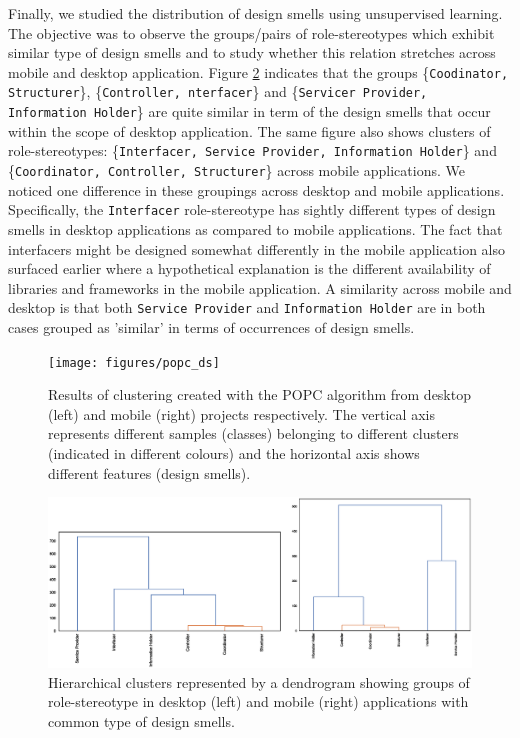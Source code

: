 \documentclass[AMA,Times1COL]{WileyNJDv5} %
\begin{document}
	Finally, we studied the distribution of design smells using unsupervised learning. The objective was to observe the groups/pairs of role-stereotypes which exhibit similar type of design smells and to study whether this relation stretches across mobile and desktop application. Figure \ref{fig:dendogram_rs} indicates that the groups \{{\tt Coodinator, Structurer}\}, 
	\{{\tt Controller, nterfacer}\} and 
	\{{\tt Servicer Provider, Information Holder}\} are quite similar in term of the design smells that occur within the scope of desktop application. The same figure also shows clusters of role-stereotypes:  \{{\tt Interfacer, Service Provider, Information Holder}\} and \{{\tt Coordinator, Controller, Structurer}\} across mobile applications. 
	We noticed one difference in these groupings across desktop and mobile applications. Specifically, the {\tt Interfacer} role-stereotype has sightly different types of design smells in desktop applications as compared to mobile applications. The fact that interfacers might be designed somewhat differently in the mobile application also surfaced earlier where a hypothetical explanation is the different availability of libraries and frameworks in the mobile application.
	A similarity across mobile and desktop is that both {\tt Service Provider} and {\tt Information Holder} are in both cases grouped as 'similar' in terms of occurrences of design smells.
	
	\begin{figure}[h]
		\centering
		\texttt{[image: figures/popc\_ds]}
		\caption{Results of clustering created with the POPC algorithm from desktop (left) and mobile (right) projects respectively. The vertical axis represents different samples (classes) belonging to different clusters (indicated in different colours) and the horizontal axis shows different features (design smells).}
			\label{fig:popc_all}
	\end{figure}
	\begin{figure}[h]
		\centering
		\includegraphics[scale=0.6]{figures/dendogram_rs.eps}
		\caption{Hierarchical clusters represented by a dendrogram showing groups of role-stereotype in desktop (left) and mobile (right) applications with common type of design smells.}
		\label{fig:dendogram_rs}
	\end{figure}
	
\end{document}
